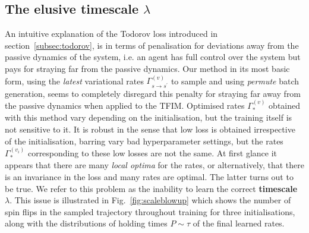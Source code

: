 \subsection{The elusive timescale $\lambda$}
\label{subsec:elusive_lambda}
An intuitive explanation of the Todorov loss introduced in section~\ref{subsec:todorov}, is in terms of penalisation for deviations away from the passive dynamics of the system, i.e. an agent has full control over the system but pays for straying far from the passive dynamics. Our method in its most basic form, using the \emph{latest} variational rates $\Gamma^{(v)}_{s \rightarrow s^\prime}$ to sample and using \emph{permute} batch generation, seems to completely disregard this penalty for straying far away from the passive dynamics when applied to the TFIM. Optimised rates $\Gamma_*^{(v)}$ obtained with this method vary depending on the initialisation, but the training itself is not sensitive to it. It is robust in the sense that low loss is obtained irrespective of the initialisation, barring vary bad hyperparameter settings, but the rates $\Gamma_*^{(v_i)}$ corresponding to these low losses are not the same. At first glance it appears that there are many \emph{local optima} for the rates, or alternatively, that there is an invariance in the loss and many rates are optimal. The latter turns out to be true. We refer to this problem as the inability to learn the correct \textbf{timescale} $\lambda$. This issue is illustrated in Fig.~\ref{fig:scaleblowup} which shows the number of spin flips in the sampled trajectory throughout training for three initialisations, along with the distributions of holding times $P \sim \tau$ of the final learned rates.
